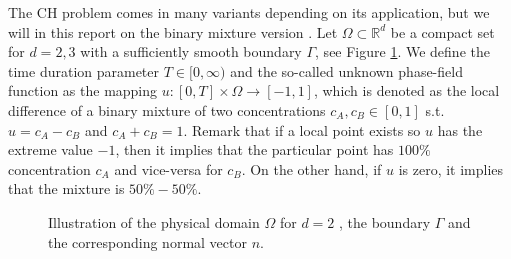 The CH problem comes in many variants depending on its application, but we will in this report on the binary mixture version \cite{miranville2017cahn}. Let $\Omega \subset  \mathbb{R} ^{d} $ be a compact set for $d=2,3$ with a sufficiently smooth boundary
$\Gamma $,  see Figure \ref{fig:domain_construction}. We define the time duration parameter $T \in  [0,\infty) $ and the
so-called unknown phase-field function as the
mapping $u: \left[ 0, T \right] \times \Omega  \to \left[ -1,1 \right]  $, which is denoted as the local difference of a binary mixture of two concentrations $c_{A}, c_{B} \in \left[ 0,1\right] $ s.t. $u = c_{A} -c_{B}$ and $c_{A} + c_{B} = 1$. Remark that if a local point exists so $u$ has the extreme value $-1$, then it implies that the particular point has $100\%$ concentration $c_{A}$ and vice-versa for $c_{B}$. On the other hand, if $u$ is zero, it implies that the mixture is $50\% - 50\%$.

\begin{figure}[htpb!]
    \centering
    \caption{Illustration of the physical domain $\Omega$ for $d=2$ , the boundary $\Gamma$ and the corresponding normal vector $n$.}
    \label{fig:domain_construction}
\end{figure}

